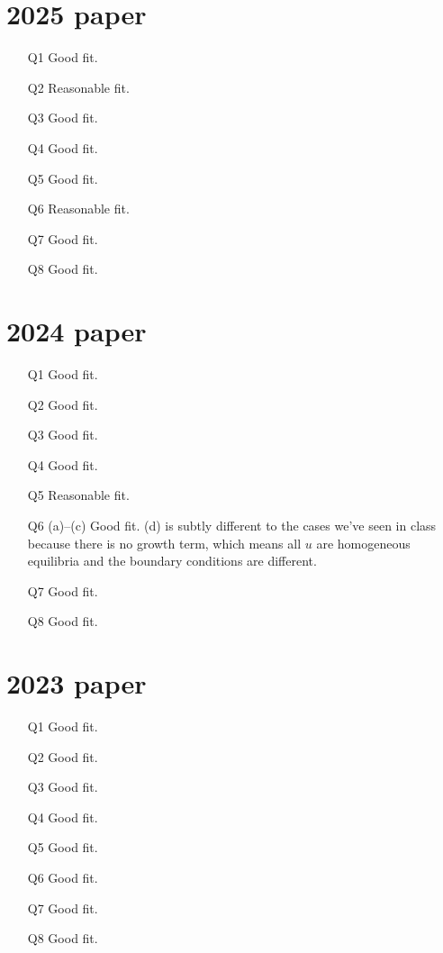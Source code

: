 \begin{multicols}{2}

\section*{2025 paper}
\begin{itemize}
\item[Q1] Good fit.
\item[Q2] Reasonable fit.
\item[Q3] Good fit.
\item[Q4] Good fit.
\item[Q5] Good fit.
\item[Q6] Reasonable fit.
\item[Q7] Good fit.
\item[Q8] Good fit.
\end{itemize}

\section*{2024 paper}
\begin{itemize}
\item[Q1] Good fit.
\item[Q2] Good fit.
\item[Q3] Good fit.
\item[Q4] Good fit.
\item[Q5] Reasonable fit.
\item[Q6] (a)--(c) Good fit. (d) is subtly different to the cases we've seen in class because there is no growth term, which means all $u$ are homogeneous equilibria and the boundary conditions are different.
\item[Q7] Good fit.
\item[Q8] Good fit.
\end{itemize}

\section*{2023 paper}
\begin{itemize}
\item[Q1] Good fit.
\item[Q2] Good fit.
\item[Q3] Good fit.
\item[Q4] Good fit.
\item[Q5] Good fit.
\item[Q6] Good fit.
\item[Q7] Good fit.
\item[Q8] Good fit.
\end{itemize}


\end{multicols}
